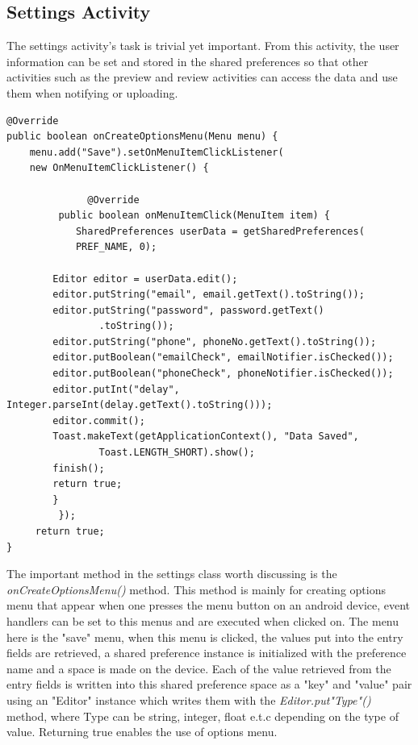 \subsection{Settings Activity}
The settings activity's task is trivial yet important. From this activity, the user information can be set and stored in the shared preferences so that other activities such as the preview and review activities can access the data and use them when notifying or uploading.

\begin{lstlisting}[label=settings-save,caption=Implementation of the settings "save" option menu]
@Override
public boolean onCreateOptionsMenu(Menu menu) {
    menu.add("Save").setOnMenuItemClickListener(
	new OnMenuItemClickListener() {

              @Override
	     public boolean onMenuItemClick(MenuItem item) {
          	SharedPreferences userData = getSharedPreferences(
			PREF_NAME, 0);

		Editor editor = userData.edit();
		editor.putString("email", email.getText().toString());
		editor.putString("password", password.getText()
				.toString());
		editor.putString("phone", phoneNo.getText().toString());
		editor.putBoolean("emailCheck", emailNotifier.isChecked());
		editor.putBoolean("phoneCheck", phoneNotifier.isChecked());
		editor.putInt("delay", Integer.parseInt(delay.getText().toString()));
		editor.commit();
		Toast.makeText(getApplicationContext(), "Data Saved",
				Toast.LENGTH_SHORT).show();
		finish();						
		return true;
	    }
         });
     return true;
}

\end{lstlisting}

The important method in the settings class worth discussing is the {\it onCreateOptionsMenu()} method. This method is mainly for creating options menu that appear when one presses the menu button on an android device, event handlers can be set to this menus and are executed when clicked on. The menu here is the "save" menu, when this menu is clicked, the values put into the entry fields are retrieved, a shared preference instance is initialized with the preference name and a space is made on the device. Each of the value retrieved from the entry fields is written into this shared preference space as a "key" and "value" pair using an "Editor" instance which writes them with the {\it Editor.put"Type"()} method, where Type can be string, integer, float e.t.c depending on the type of value. Returning true enables the use of options menu.

